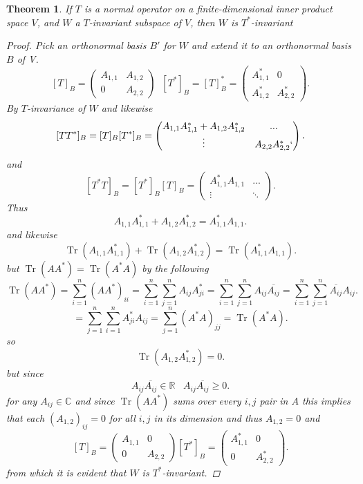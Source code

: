 \documentclass{article}
\DeclareMathOperator{\tr}{Tr}
\newtheorem{theorem}{Theorem}[section] %
\begin{document}
    \begin{theorem}\label{thm:big}
        If $T$ is a normal operator on a finite-dimensional inner product space $V$, and $W$ 
        a $T$-invariant subspace of $V$, then $W$ is $T^{*}$-invariant
        \begin{proof}
            Pick an orthonormal basis $B'$ for  $W$ and extend it to an orthonormal basis $B$ of V.
             \[
         [T]_B = \begin{pmatrix} A_{1,1} & A_{1,2} \\ 0 & A_{2,2} \end{pmatrix} \;\;
         [T^{*}]_B = [T]_B^{*} = \begin{pmatrix}
             A_{1,1}^{*} & 0\\
             A_{1,2}^{*} & A_{2,2}^{*}
         \end{pmatrix}
    .\]
    By $T$-invariance of $W$
    and likewise
    \[
        [TT^{*}]_B = [T]_B[T^{*}]_B = \begin{pmatrix}
            A_{1,1}A^{*}_{1,1} + A_{1,2}A^{*}_{1,2} & ... \\
            \vdots & A_{2,2}A^{*}_{2,2}
        `\end{pmatrix}
    .\]
    and
    \[
        [T^{*}T]_B = [T^{*}]_B[T]_B = \begin{pmatrix}
            A^{*}_{1,1}A_{1,1} & ...\\
            \vdots & \ddots
        \end{pmatrix}
    .\]
    Thus
    \[
        A_{1,1}A_{1,1}^{*} + A_{1,2}A_{1,2}^{*} = A^{*}_{1,1}A_{1,1}
    .\]
    and likewise
    \[
        \tr(A_{1,1}A_{1,1}^{*}) + \tr(A_{1,2}A_{1,2}^{*}) = \tr(A^{*}_{1,1}A_{1,1})
    .\]
    but $\tr(AA^{*}) = \tr(A^{*}A)$ by the following
    \[
        \tr(AA^{*}) = \sum_{i=1}^{n}(AA^{*})_{ii} = \sum_{i=1}^{n}\sum_{j=1}^{n}A_{ij}A^{*}_{ji} = \sum_{i=1}^{n}\sum_{j=1}^{n}A_{ij}\overline{A_{ij}} = \sum_{i=1}^{n}\sum_{j=1}^{n}\overline{A_{ij}}A_{ij}
    .\]
    \[
        = \sum_{j=1}^{n}\sum_{i=1}^{n}A^{*}_{ji}A_{ij} = \sum_{j=1}^{n}(A^{*}A)_{jj} = \tr(A^{*}A)
    .\]
    so
    \[
        \tr(A_{1,2}A^{*}_{1,2}) = 0
    .\]
    but since
    \[
        A_{ij}\overline{A_{ij}} \in \mathbb{R} \;\;\; A_{ij}\overline{A_{ij}} \ge 0
    .\]
    for any $A_{ij} \in \mathbb{C}$ and since $\tr(AA^{*})$ sums over every $i,j$ pair in $A$
    this implies that each $(A_{1,2})_{ij} = 0$ for all $i,j$ in its dimension and thus  $A_{1,2} = 0$ and
     \[
         [T]_B = \begin{pmatrix}
         A_{1,1} & 0\\
         0 & A_{2,2}
     \end{pmatrix}
     [T^{*}]_B = \begin{pmatrix}
         A^{*}_{1,1} & 0\\
         0 & A^{*}_{2,2}
     \end{pmatrix}
    .\]
    from which it is evident that $W$ is $T^{*}$-invariant.
        \end{proof}
    \end{theorem}
\end{document}
